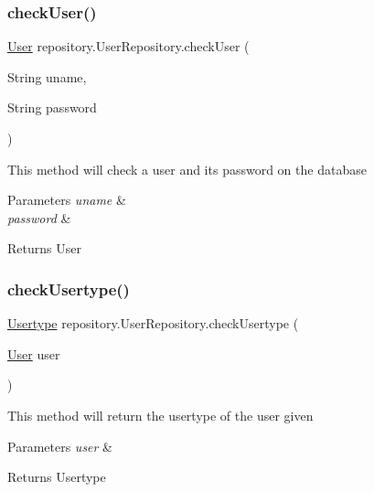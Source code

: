 \subsubsection{\texorpdfstring{check\+User()}{checkUser()}}
{\footnotesize\ttfamily \mbox{\hyperlink{classentity_1_1_user}{User}} repository.\+User\+Repository.\+check\+User (\begin{DoxyParamCaption}\item[{String}]{uname,  }\item[{String}]{password }\end{DoxyParamCaption})\hspace{0.3cm}{\ttfamily [inline]}}

This method will check a user and its password on the database 
\begin{DoxyParams}{Parameters}
{\em uname} & \\
\hline
{\em password} & ~\newline
\\
\hline
\end{DoxyParams}
\begin{DoxyReturn}{Returns}
User 
\end{DoxyReturn}
\mbox{\label{classrepository_1_1_user_repository_a8e4a797c0eb806d34793295af70fd281}} 
\subsubsection{\texorpdfstring{check\+Usertype()}{checkUsertype()}}
{\footnotesize\ttfamily \mbox{\hyperlink{classentity_1_1_usertype}{Usertype}} repository.\+User\+Repository.\+check\+Usertype (\begin{DoxyParamCaption}\item[{\mbox{\hyperlink{classentity_1_1_user}{User}}}]{user }\end{DoxyParamCaption})\hspace{0.3cm}{\ttfamily [inline]}}

This method will return the usertype of the user given 
\begin{DoxyParams}{Parameters}
{\em user} & ~\newline
\\
\hline
\end{DoxyParams}
\begin{DoxyReturn}{Returns}
Usertype 
\end{DoxyReturn}
\mbox{\label{classrepository_1_1_user_repository_a487c490af80c0a94477bfcfdbe7d288f}} 
